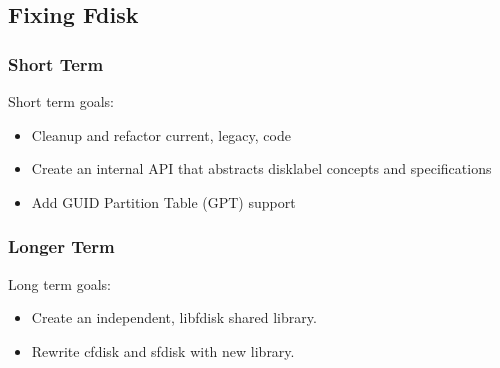 \subsection{Fixing Fdisk}
\begin{frame}\frametitle{Short Term}
  Short term goals:
  \begin{itemize}
  \item Cleanup and refactor current, legacy, code
  \item Create an internal API that abstracts disklabel concepts and specifications
  \item Add GUID Partition Table (GPT) support
  \end{itemize}
\end{frame}

\begin{frame}\frametitle{Longer Term}
  Long term goals:
  \begin{itemize}
  \item Create an independent, libfdisk shared library.
  \item Rewrite cfdisk and sfdisk with new library.
  \end{itemize}
\end{frame}
